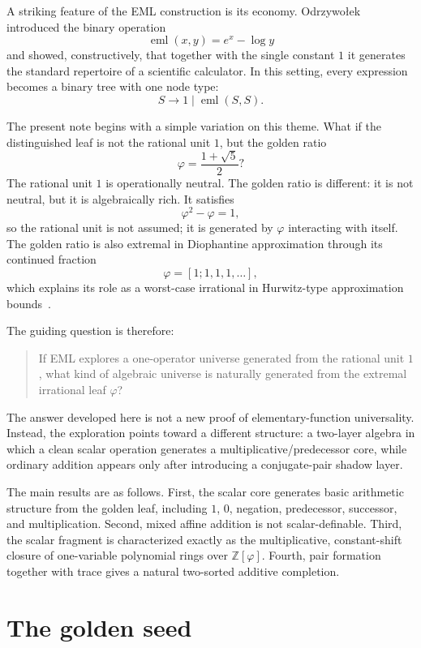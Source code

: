 \documentclass[11pt]{article}
\newcommand{\ph}{\varphi}
\newcommand{\Z}{\mathbb{Z}}
\begin{document}
A striking feature of the EML construction is its economy.  Odrzywo\l{}ek~\cite{Odrzywolek2026EML} introduced the binary operation
\[
    \operatorname{eml}(x,y)=e^x-\log y
\]
and showed, constructively, that together with the single constant $1$ it generates the standard repertoire of a scientific calculator.  In this setting, every expression becomes a binary tree with one node type:
\[
    S \to 1 \mid \operatorname{eml}(S,S).
\]

The present note begins with a simple variation on this theme.  What if the distinguished leaf is not the rational unit $1$, but the golden ratio
\[
    \ph=\frac{1+\sqrt5}{2}?
\]
The rational unit $1$ is operationally neutral.  The golden ratio is different: it is not neutral, but it is algebraically rich.  It satisfies
\[
    \ph^2-\ph=1,
\]
so the rational unit is not assumed; it is generated by $\ph$ interacting with itself.  The golden ratio is also extremal in Diophantine approximation through its continued fraction
\[
    \ph=[1;1,1,1,\dots],
\]
which explains its role as a worst-case irrational in Hurwitz-type approximation bounds~\cite{HardyWright2008,Hurwitz1891}.

The guiding question is therefore:
\begin{quote}
If EML explores a one-operator universe generated from the rational unit $1$, what kind of algebraic universe is naturally generated from the extremal irrational leaf $\ph$?
\end{quote}

The answer developed here is not a new proof of elementary-function universality.  Instead, the exploration points toward a different structure: a two-layer algebra in which a clean scalar operation generates a multiplicative/predecessor core, while ordinary addition appears only after introducing a conjugate-pair shadow layer.

The main results are as follows.  First, the scalar core generates basic arithmetic structure from the golden leaf, including $1$, $0$, negation, predecessor, successor, and multiplication.  Second, mixed affine addition is not scalar-definable.  Third, the scalar fragment is characterized exactly as the multiplicative, constant-shift closure of one-variable polynomial rings over $\Z[\ph]$.  Fourth, pair formation together with trace gives a natural two-sorted additive completion.

\section{The golden seed}
\end{document}
